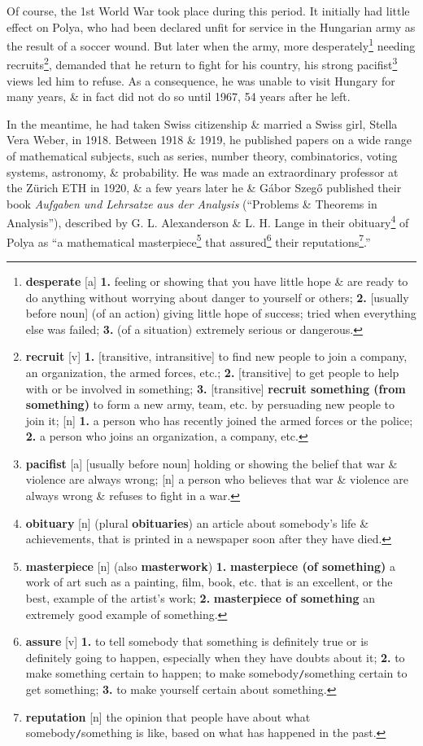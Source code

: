 \documentclass[oneside]{book}
\numberwithin{equation}{section}
\begin{document}
Of course, the 1st World War took place during this period. It initially had little effect on Polya, who had been declared unfit for service in the Hungarian army as the result of a soccer wound. But later when the army, more desperately\footnote{\textbf{desperate} [a] \textbf{1.} feeling or showing that you have little hope \& are ready to do anything without worrying about danger to yourself or others; \textbf{2.} [usually before noun] (of an action) giving little hope of success; tried when everything else was failed; \textbf{3.} (of a situation) extremely serious or dangerous.} needing recruits\footnote{\textbf{recruit} [v] \textbf{1.} [transitive, intransitive] to find new people to join a company, an organization, the armed forces, etc.; \textbf{2.} [transitive] to get people to help with or be involved in something; \textbf{3.} [transitive] \textbf{recruit something (from something)} to form a new army, team, etc. by persuading new people to join it; [n] \textbf{1.} a person who has recently joined the armed forces or the police; \textbf{2.}  a person who joins an organization, a company, etc.}, demanded that he return to fight for his country, his strong pacifist\footnote{\textbf{pacifist} [a] [usually before noun] holding or showing the belief that war \& violence are always wrong; [n] a person who believes that war \& violence are always wrong \& refuses to fight in a war.} views led him to refuse. As a consequence, he was unable to visit Hungary for many years, \& in fact did not do so until 1967, 54 years after he left.

In the meantime, he had taken Swiss citizenship \& married a Swiss girl, Stella Vera Weber, in 1918. Between 1918 \& 1919, he published papers on a wide range of mathematical subjects, such as series, number theory, combinatorics, voting systems, astronomy, \& probability. He was made an extraordinary professor at the Z\"urich ETH in 1920, \& a few years later he \& G\'abor Szeg\H{o} published their book \textit{Aufgaben und Lehrsatze aus der Analysis} (``Problems \& Theorems in Analysis''), described by G. L. Alexanderson \& L. H. Lange in their obituary\footnote{\textbf{obituary} [n] (plural \textbf{obituaries}) an article about somebody's life \& achievements, that is printed in a newspaper soon after they have died.} of Polya as ``a mathematical masterpiece\footnote{\textbf{masterpiece} [n] (also \textbf{masterwork}) \textbf{1.} \textbf{masterpiece (of something)} a work of art such as a painting, film, book, etc. that is an excellent, or the best, example of the artist's work; \textbf{2.} \textbf{masterpiece of something} an extremely good example of something.} that assured\footnote{\textbf{assure} [v] \textbf{1.} to tell somebody that something is definitely true or is definitely going to happen, especially when they have doubts about it; \textbf{2.} to make something certain to happen; to make somebody\texttt{/}something certain to get something; \textbf{3.} to make yourself certain about something.} their reputations\footnote{\textbf{reputation} [n] the opinion that people have about what somebody\texttt{/}something is like, based on what has happened in the past.}.''
\end{document}
